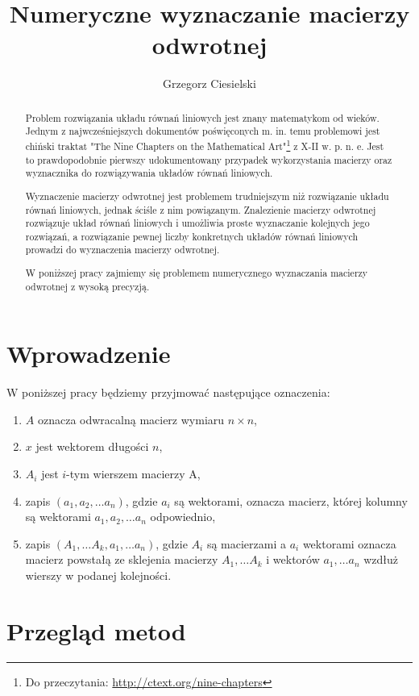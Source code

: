 \documentclass{article}
\title{Numeryczne wyznaczanie macierzy odwrotnej}
\author{Grzegorz Ciesielski}
\begin{document}
\maketitle

\begin{abstract}

Problem rozwiązania układu równań liniowych jest znany matematykom od wieków. Jednym z najwcześniejszych dokumentów poświęconych m. in. temu problemowi jest chiński traktat "The Nine Chapters on the Mathematical Art"\footnote{Do przeczytania: \url{http://ctext.org/nine-chapters}} z X-II w. p. n. e. Jest to prawdopodobnie pierwszy udokumentowany przypadek wykorzystania macierzy oraz wyznacznika do rozwiązywania układów równań liniowych. 

Wyznaczenie macierzy odwrotnej jest problemem trudniejszym niż rozwiązanie układu równań liniowych, jednak ściśle z nim powiązanym. Znalezienie macierzy odwrotnej rozwiązuje układ równań liniowych i umożliwia proste wyznaczanie kolejnych jego rozwiązań, a rozwiązanie pewnej liczby konkretnych układów równań liniowych prowadzi do wyznaczenia macierzy odwrotnej.

W poniższej pracy zajmiemy się problemem numerycznego wyznaczania macierzy odwrotnej z wysoką precyzją.

\end{abstract}

\section{Wprowadzenie}
W poniższej pracy będziemy przyjmować następujące oznaczenia:
\begin{enumerate}
\item $A$ oznacza odwracalną macierz wymiaru $n\times n$,
\item $x$ jest wektorem długości $n$,
\item $A_i$ jest $i$-tym wierszem macierzy A,
\item zapis $(a_1, a_2, \dots a_n)$, gdzie $a_i$ są wektorami, oznacza macierz, której kolumny są wektorami $a_1, a_2, \dots a_n$ odpowiednio,
\item zapis $(A_1, \dots A_k, a_1, \dots a_n)$, gdzie $A_i$ są macierzami a $a_i$ wektorami oznacza macierz powstałą ze sklejenia macierzy $A_1, \dots A_k$ i wektorów $a_1, \dots a_n$ wzdłuż wierszy w podanej kolejności.
\end{enumerate}

\section{Przegląd metod}
\end{document}
